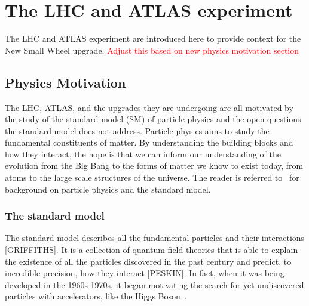 
\chapter{The LHC and ATLAS experiment}
\label{chap:lhc_atlas}

The LHC and ATLAS experiment are introduced here to provide context for the New Small Wheel upgrade. \textcolor{red}{Adjust this based on new physics motivation section}

\section{Physics Motivation}

The LHC, ATLAS, and the upgrades they are undergoing are all motivated by the study of the standard model (SM) of particle physics and the open questions the standard model does not address. Particle physics aims to study the fundamental constituents of matter. By understanding the building blocks and how they interact, the hope is that we can inform our understanding of the evolution from the Big Bang to the forms of matter we know to exist today, from atoms to the large scale structures of the universe. The reader is referred to~\cite{griffiths_introduction_2011, peskin_introduction_1995, zyla_review_2020} for background on particle physics and the standard model. 

\subsection{The standard model}

The standard model describes all the fundamental particles and their interactions [GRIFFITHS]. It is a collection of quantum field theories that is able to explain the existence of all the particles discovered in the past century and predict, to incredible precision, how they interact [PESKIN]. In fact, when it was being developed in the 1960s-1970s, it began motivating the search for yet undiscovered particles with accelerators, like the Higgs Boson~\cite{brianti_large_1984}. 

